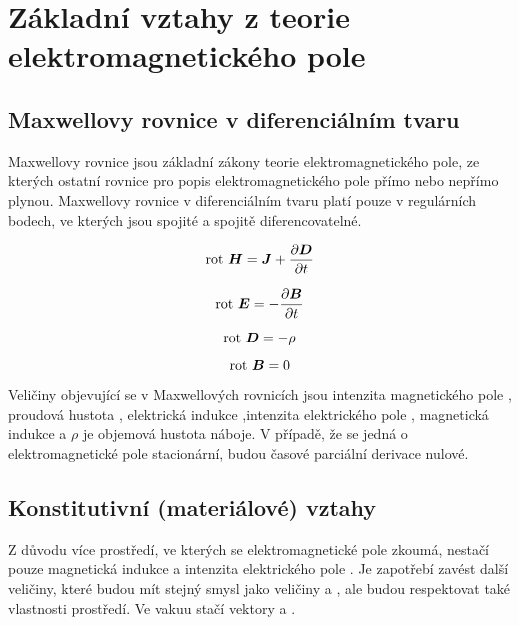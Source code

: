 \chapter{Základní vztahy z teorie elektromagnetického pole}
\label{zakladni_vztahy_z_teorie_elektromagnetickeho_pole}
\section{Maxwellovy rovnice v diferenciálním tvaru}
Maxwellovy rovnice jsou základní zákony teorie elektromagnetického pole, ze kterých ostatní rovnice pro popis elektromagnetického pole přímo nebo nepřímo plynou. Maxwellovy rovnice v diferenciálním tvaru platí pouze v regulárních bodech, ve kterých jsou spojité a spojitě diferencovatelné.

\begin{equation}
	\mathrm{rot}\  \mbox{\boldmath$H$} = \mbox{\boldmath$J$} + \frac{\partial \mbox{\boldmath$D$}}{\partial t}
	\label{prvni_maxwellova_rovnice}
\end{equation}

\begin{equation}
	\mathrm{rot}\  \mbox{\boldmath$E$} = - \frac{\partial \mbox{\boldmath$B$}}{\partial t}
	\label{druha_maxwellova_rovnice}
\end{equation}

\begin{equation}
	\mathrm{rot}\  \mbox{\boldmath$D$} = - \rho
	\label{treti_maxwellova_rovnice}
\end{equation}

\begin{equation}
	\mathrm{rot}\  \mbox{\boldmath$B$} = 0
	\label{ctvrta_maxwellova_rovnice}
\end{equation}

Veličiny objevující se v Maxwellových rovnicích jsou intenzita magnetického pole , proudová hustota , elektrická indukce ,intenzita elektrického pole , magnetická indukce   a $\rho$ je objemová hustota náboje.
	V případě, že se jedná o elektromagnetické pole stacionární, budou časové parciální derivace nulové.
	
\section{Konstitutivní (materiálové) vztahy}
Z důvodu více prostředí, ve kterých se elektromagnetické pole zkoumá, nestačí pouze magnetická indukce  a intenzita elektrického pole . Je zapotřebí zavést další veličiny, které budou mít stejný smysl jako veličiny  a , ale budou respektovat také vlastnosti prostředí. Ve vakuu stačí vektory  a .

